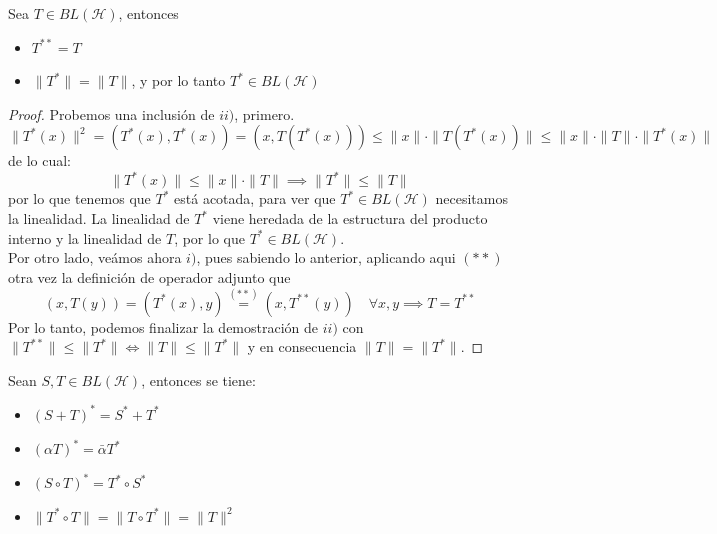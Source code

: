 \begin{prop}
    Sea $T\in BL(\mathcal{H})$, entonces 
    \begin{itemize}
        \item[i)] $T^{**} = T$
        \item[ii)] $\|T^*\| = \|T\|$, y por lo tanto $T^* \in BL(\mathcal{H})$
    \end{itemize}
\begin{proof}
    Probemos una inclusión de $ii)$, primero.
    \begin{equation*}
        \|T^*(x)\|^2 = (T^*(x), T^*(x)) = (x, T(T^*(x))) \le \|x\| \cdot \|T(T^*(x))\| \le \|x\| \cdot \|T\| \cdot \|T^*(x)\|
    \end{equation*}
    de lo cual:
    \[ \|T^*(x)\| \le \|x\| \cdot \|T\| \implies \|T^*\| \le \|T\| \]
    por lo que tenemos que $T^*$ está acotada, para ver que $T^*\in BL(\mathcal{H})$ necesitamos la linealidad. La linealidad de $T^*$ viene heredada de la estructura del producto interno y la linealidad de $T$, por lo que $T^*\in BL(\mathcal{H})$. \\
    \noindent
    Por otro lado, veámos ahora $i)$, pues sabiendo lo anterior, aplicando aqui $(**)$ otra vez la definición de operador adjunto que
    $$(x, T(y)) = (T^*(x), y) \overset{(**)}{=} (x, T^{**}(y)) \quad \forall x, y \implies T = T^{**}$$
    Por lo tanto, podemos finalizar la demostración de $ii)$ con $\|T^{**}\| \le \|T^*\| \iff \|T\| \le \|T^*\|$ y en consecuencia $\|T\| = \|T^*\|$.
\end{proof}
\end{prop}

\begin{prop}
    Sean $S, T \in BL(\mathcal{H})$, entonces se tiene:
    \begin{itemize}
        \item $(S + T)^* = S^* + T^*$
        \item $(\alpha T)^* = \bar{\alpha} T^*$
        \item $(S \circ T)^* = T^* \circ S^*$
        \item $\|T^* \circ T\| = \|T \circ T^*\| = \|T\|^2$ \\
    \end{itemize}
\end{prop}

